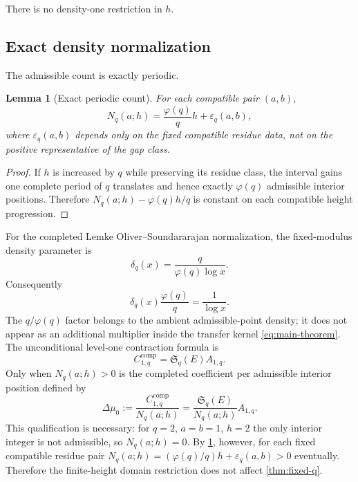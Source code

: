 \documentclass[11pt]{article}
\newtheorem{lemma}[theorem]{Lemma}
\theoremstyle{definition}
\theoremstyle{remark}
\newcommand{\SSer}{\mathfrak S}
\newcommand{\1}{\mathbf 1}
\newcommand{\ph}{\varphi}
\newcommand{\eps}{\varepsilon}
\begin{document}
There is no density-one restriction in $h$.

\subsection{Exact density normalization}

The admissible count is exactly periodic.

\begin{lemma}[Exact periodic count]\label{lem:Nq}
For each compatible pair $(a,b)$,
\begin{equation}\label{eq:Nq-periodic}
\boxed{N_q(a;h)=\frac{\ph(q)}q h+\eps_q(a,b),}
\end{equation}
where $\eps_q(a,b)$ depends only on the fixed compatible residue data, not on the positive representative of the gap class.
\end{lemma}

\begin{proof}
If $h$ is increased by $q$ while preserving its residue class, the interval gains one complete period of $q$ translates and hence exactly $\ph(q)$ admissible interior positions.  Therefore $N_q(a;h)-\ph(q)h/q$ is constant on each compatible height progression.
\end{proof}

For the completed Lemke Oliver--Soundararajan normalization, the fixed-modulus density parameter is
\begin{equation}\label{eq:deltaq}
\delta_q(x)=\frac{q}{\ph(q)\log x}.
\end{equation}
Consequently
\[
\delta_q(x)\frac{\ph(q)}q=\frac1{\log x}.
\]
The $q/\ph(q)$ factor belongs to the ambient admissible-point density; it does not appear as an additional multiplier inside the transfer kernel \eqref{eq:main-theorem}.  The unconditional level-one contraction formula is
\begin{equation}\label{eq:LOS-level-one}
 C_{1,q}^{\mathrm{comp}}=\SSer_q(E)A_{1,q}.
\end{equation}
Only when $N_q(a;h)>0$ is the completed coefficient per
admissible interior position defined by
\begin{equation}\label{eq:LOS-level-one-per-site}
 \Delta\mu_0:=\frac{C_{1,q}^{\mathrm{comp}}}{N_q(a;h)}
 =\frac{\SSer_q(E)}{N_q(a;h)}A_{1,q}.
\end{equation}
This qualification is necessary: for $q=2$, $a=b=1$, $h=2$
the only interior integer is not admissible, so $N_q(a;h)=0$.
By \cref{lem:Nq}, however, for each fixed compatible residue pair
$N_q(a;h)=(\ph(q)/q)h+\eps_q(a,b)>0$ eventually. Therefore the
finite-height domain restriction does not affect
\cref{thm:fixed-q}.
\end{document}
